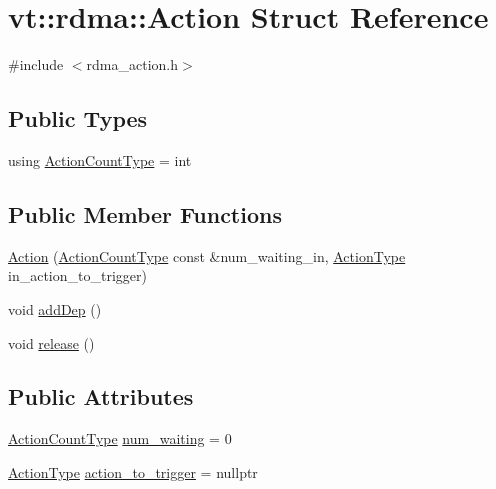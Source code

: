 \hypertarget{structvt_1_1rdma_1_1_action}{}\section{vt\+:\+:rdma\+:\+:Action Struct Reference}
\label{structvt_1_1rdma_1_1_action}


{\ttfamily \#include $<$rdma\+\_\+action.\+h$>$}

\subsection*{Public Types}
\begin{DoxyCompactItemize}
\item 
using \hyperlink{structvt_1_1rdma_1_1_action_a7c893809966c9c8c871002d5283728f0}{Action\+Count\+Type} = int
\end{DoxyCompactItemize}
\subsection*{Public Member Functions}
\begin{DoxyCompactItemize}
\item 
\hyperlink{structvt_1_1rdma_1_1_action_a06e789113fd8ab00e25e3beb6c36581b}{Action} (\hyperlink{structvt_1_1rdma_1_1_action_a7c893809966c9c8c871002d5283728f0}{Action\+Count\+Type} const \&num\+\_\+waiting\+\_\+in, \hyperlink{namespacevt_ae0a5a7b18cc99d7b732cb4d44f46b0f3}{Action\+Type} in\+\_\+action\+\_\+to\+\_\+trigger)
\item 
void \hyperlink{structvt_1_1rdma_1_1_action_ab4b3a15189ddb23b25b664ffafd7b2dd}{add\+Dep} ()
\item 
void \hyperlink{structvt_1_1rdma_1_1_action_a8806d1adee33037e5d24d5dd109a21d3}{release} ()
\end{DoxyCompactItemize}
\subsection*{Public Attributes}
\begin{DoxyCompactItemize}
\item 
\hyperlink{structvt_1_1rdma_1_1_action_a7c893809966c9c8c871002d5283728f0}{Action\+Count\+Type} \hyperlink{structvt_1_1rdma_1_1_action_a73109ea6c95089a53e639c22c5061d47}{num\+\_\+waiting} = 0
\item 
\hyperlink{namespacevt_ae0a5a7b18cc99d7b732cb4d44f46b0f3}{Action\+Type} \hyperlink{structvt_1_1rdma_1_1_action_a4a559b38b1e3d551f25f4874d0c17bec}{action\+\_\+to\+\_\+trigger} = nullptr
\end{DoxyCompactItemize}



